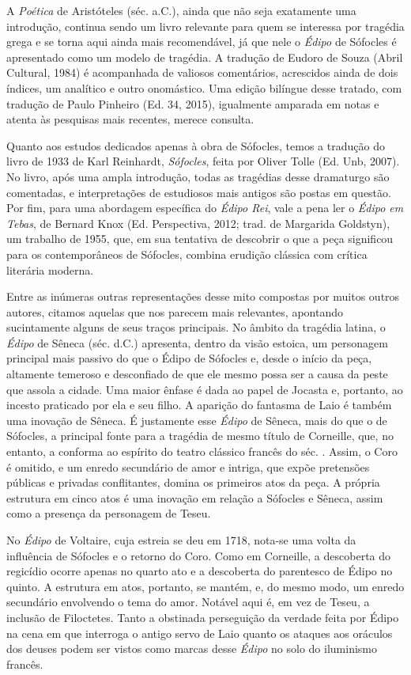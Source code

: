 A \emph{Poética} de Aristóteles (séc.  a.C.), ainda que não
seja exatamente uma introdução, continua sendo um livro relevante para
quem se interessa por tragédia grega e se torna aqui ainda mais
recomendável, já que nele o \emph{Édipo} de Sófocles é apresentado como
um modelo de tragédia. A tradução de Eudoro de Souza (Abril Cultural,
1984) é acompanhada de valiosos comentários, acrescidos ainda de dois
índices, um analítico e outro onomástico. Uma edição bilíngue desse
tratado, com tradução
de Paulo Pinheiro (Ed. 34, 2015), igualmente amparada em notas e atenta às
pesquisas mais recentes, merece consulta.

Quanto aos estudos dedicados apenas à obra de Sófocles, temos a tradução
do livro de 1933 de Karl Reinhardt, \emph{Sófocles}, feita por
Oliver Tolle (Ed. Unb, 2007). No livro, após uma ampla introdução, todas
as tragédias desse dramaturgo são comentadas, e interpretações de
estudiosos mais antigos são postas em questão. Por fim, para uma
abordagem específica do \emph{Édipo Rei}, vale a pena ler o
\emph{Édipo em Tebas}, de Bernard Knox (Ed. Perspectiva, 2012;
trad. de Margarida Goldstyn), um trabalho de 1955, que, em sua tentativa
de descobrir o que a peça significou para os contemporâneos de Sófocles,
combina erudição clássica com crítica literária moderna.

Entre as inúmeras outras representações desse mito compostas por muitos
outros autores, citamos aquelas que nos parecem mais relevantes,
apontando sucintamente alguns de seus traços principais. No âmbito da
tragédia latina, o \emph{Édipo} de Sêneca (séc.  d.C.)
apresenta, dentro da visão estoica, um personagem principal mais passivo
do que o Édipo de Sófocles e, desde o início da peça, altamente temeroso
e desconfiado de que ele mesmo possa ser a causa da peste que assola a
cidade. Uma maior ênfase é dada ao papel de Jocasta e, portanto, ao
incesto praticado por ela e seu filho. A aparição do fantasma de Laio é
também uma inovação de Sêneca. É justamente esse \emph{Édipo} de Sêneca,
mais do que o de Sófocles, a principal fonte para a tragédia de mesmo
título de Corneille, que, no entanto, a conforma ao espírito do
teatro clássico francês do séc. . Assim, o Coro é omitido, e um
enredo secundário de amor e intriga, que expõe pretensões públicas e
privadas conflitantes, domina os primeiros atos da peça. A própria
estrutura em cinco atos é uma inovação em relação a Sófocles e Sêneca,
assim como a presença da personagem de Teseu.

No \emph{Édipo} de Voltaire, cuja estreia se deu em 1718,
nota-se uma volta da influência de Sófocles e o retorno do Coro. Como em
Corneille, a descoberta do regicídio ocorre apenas no quarto ato e a
descoberta do parentesco de Édipo no quinto. A estrutura em atos,
portanto, se mantém, e, do mesmo modo, um enredo secundário envolvendo o
tema do amor. Notável aqui é, em vez de Teseu, a inclusão de Filoctetes.
Tanto a obstinada perseguição da verdade feita por Édipo na cena em que
interroga o antigo servo de Laio quanto os ataques aos oráculos dos
deuses podem ser vistos como marcas desse \emph{Édipo} no solo do
iluminismo francês.

